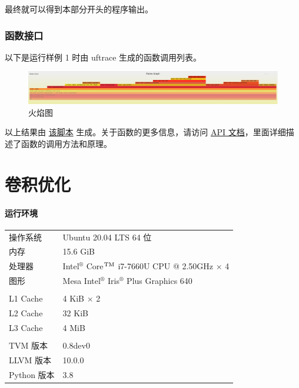 \documentclass[UTF8]{ctexart}
\begin{document}
最终就可以得到本部分开头的程序输出。

\section{函数接口}

以下是运行样例 1 时由 uftrace\cite{uft} 生成的函数调用列表。


\begin{figure}[H]
    \centering
        \includegraphics[width=\textwidth]{img/flame.png}
    \caption{火焰图\cite{flame}}
    \label{fig:flame}
\end{figure}

以上结果由 \href{run:../opg/uftrace.sh}{该脚本} 生成。关于函数的更多信息，请访问 \href{run:../opg/target/doc/opg/index.html}{API 文档}，里面详细描述了函数的调用方法和原理。%

\vspace*{5em}

\part{卷积优化}
\subsection*{运行环境}
\begin{tabular}{ll}
    操作系统 & Ubuntu 20.04 LTS 64 位\\
    内存 & 15.6 GiB \\
    处理器 & Intel$^\circledR$ Core$^{\rm TM}$ i7-7660U CPU @ 2.50GHz $\times$ 4\\
    图形 & Mesa Intel$^\circledR$ Iris$^\circledR$ Plus Graphics 640 \\
    &\\
    L1 Cache & 4 KiB $\times$ 2 \\
    L2 Cache & 32 KiB \\
    L3 Cache & 4 MiB \\
    &\\
    TVM 版本 & 0.8dev0 \\
    LLVM 版本 & 10.0.0 \\
    Python 版本 & 3.8 \\
\end{tabular}
\end{document}

